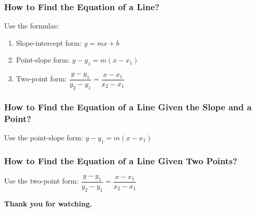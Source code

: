 \documentclass[14pt]{beamer}
\begin{document}
\begin{frame}
	\frametitle{How to Find the Equation of a Line?}
	Use the formulae:
	\begin{enumerate}  
		\item Slope-intercept form: $ y = mx + b $
		\item \pause Point-slope form: $ y - y_1 = m(x - x_1) $
		\item \pause Two-point form: $  \dfrac{y - y_1}{y_2 - y_1} = \dfrac{x - x_1}{x_2 - x_1}$
	\end{enumerate}  
\end{frame}

\begin{frame}
	\frametitle{How to Find the Equation of a Line Given the Slope and a Point?}
	Use the point-slope form:  $ y - y_1 = m(x - x_1) $
\end{frame}

    \begin{frame}
	\frametitle{How to Find the Equation of a Line Given Two Points?}
	Use the two-point form: $  \dfrac{y - y_1}{y_2 - y_1} = \dfrac{x - x_1}{x_2 - x_1}$
\end{frame}

    \begin{frame}
    	\begin{center}
    		\textbf{\LARGE Thank you for watching.}
    	\end{center}
    \end{frame}
	
\end{document}
